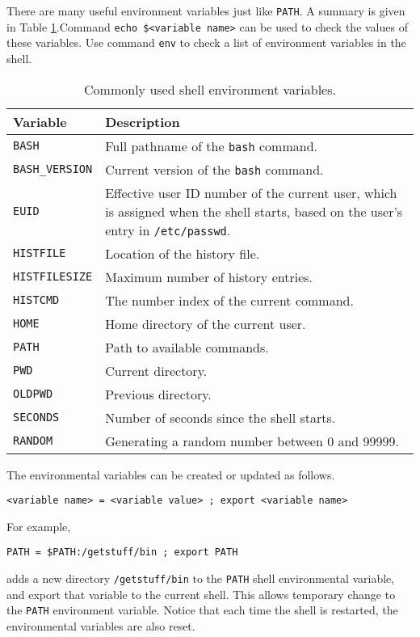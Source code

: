 There are many useful environment variables just like \verb|PATH|. A summary is given in Table \ref{ch:sb:tab:shellenvironmentvars}.Command \verb|echo $<variable name>| can be used to check the values of these variables. Use command \verb|env| to check a list of environment variables in the shell.

\begin{table}[!htb]
	\centering \caption{Commonly used shell environment variables.}\label{ch:sb:tab:shellenvironmentvars}
	\begin{tabularx}{\textwidth}{lX}
		\hline
		Variable & Description \\ \hline
		\verb|BASH| & Full pathname of the \verb|bash| command. \\ 
		\verb|BASH_VERSION| & Current version of the \verb|bash| command. \\ 
		\verb|EUID| & Effective user ID number of the current user, which is assigned when the shell starts, based on the user's entry in \verb|/etc/passwd|. \\ 
		\verb|HISTFILE| & Location of the history file. \\ 
		\verb|HISTFILESIZE| & Maximum number of history entries. \\ 
		\verb|HISTCMD| & The number index of the current command. \\ 
		\verb|HOME| & Home directory of the current user. \\ 
		\verb|PATH| & Path to available commands. \\ 
		\verb|PWD| & Current directory. \\ 
		\verb|OLDPWD| & Previous directory. \\ 
		\verb|SECONDS| & Number of seconds since the shell starts. \\ 
		\verb|RANDOM| & Generating a random number between 0 and 99999. \\
		\hline
	\end{tabularx}
\end{table}

The environmental variables can be created or updated as follows.
\begin{lstlisting}
<variable name> = <variable value> ; export <variable name>
\end{lstlisting}
For example,
\begin{lstlisting}
PATH = $PATH:/getstuff/bin ; export PATH
\end{lstlisting}
adds a new directory \verb|/getstuff/bin| to the \verb|PATH| shell environmental variable, and export that variable to the current shell. This allows temporary change to the \verb|PATH| environment variable. Notice that each time the shell is restarted, the environmental variables are also reset. 

